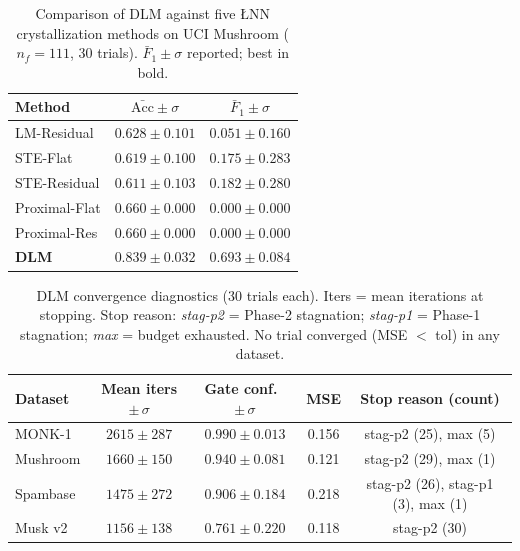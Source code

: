 \begin{table}[t]
\caption{Comparison of DLM against five ŁNN crystallization methods on UCI Mushroom
         ($n_f=111$, 30 trials). $\bar{F}_1 \pm \sigma$ reported; best in bold.}
\label{tab:dlm_vs_lnn_mushroom}
\centering
\renewcommand{\arraystretch}{1.15}
\begin{tabular}{l cc}
\toprule
Method & $\bar{\mathrm{Acc}} \pm \sigma$ & $\bar{F}_1 \pm \sigma$ \\
\midrule
LM-Residual     & $0.628 \pm 0.101$ & $0.051 \pm 0.160$ \\
STE-Flat        & $0.619 \pm 0.100$ & $0.175 \pm 0.283$ \\
STE-Residual    & $0.611 \pm 0.103$ & $0.182 \pm 0.280$ \\
Proximal-Flat   & $0.660 \pm 0.000$ & $0.000 \pm 0.000$ \\
Proximal-Res    & $0.660 \pm 0.000$ & $0.000 \pm 0.000$ \\
\midrule
\textbf{DLM}    & $\mathbf{0.839 \pm 0.032}$ & $\mathbf{0.693 \pm 0.084}$ \\
\bottomrule
\end{tabular}
\end{table}


\begin{table}[t]
\caption{DLM convergence diagnostics (30 trials each).
         Iters = mean iterations at stopping.
         Stop reason: \textit{stag-p2} = Phase-2 stagnation; \textit{stag-p1} = Phase-1 stagnation;
         \textit{max} = budget exhausted. No trial converged (MSE $<$ tol) in any dataset.}
\label{tab:dlm_convergence}
\centering
\renewcommand{\arraystretch}{1.15}
\begin{tabular}{l ccc c}
\toprule
Dataset & Mean iters $\pm\,\sigma$ & Gate conf.\ $\pm\,\sigma$ & MSE & Stop reason (count) \\
\midrule
MONK-1   & $2615 \pm 287$ & $0.990 \pm 0.013$ & 0.156 & stag-p2 (25), max (5) \\
Mushroom & $1660 \pm 150$ & $0.940 \pm 0.081$ & 0.121 & stag-p2 (29), max (1) \\
Spambase & $1475 \pm 272$ & $0.906 \pm 0.184$ & 0.218 & stag-p2 (26), stag-p1 (3), max (1) \\
Musk v2  & $1156 \pm 138$ & $0.761 \pm 0.220$ & 0.118 & stag-p2 (30) \\
\bottomrule
\end{tabular}
\end{table}
